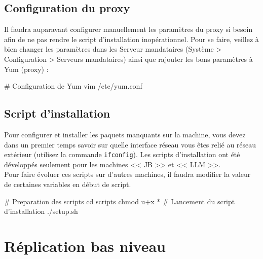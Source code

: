 \documentclass[11pt,a4paper]{report}
\begin{document}
            \subsection{Configuration du proxy}
                
                Il faudra auparavant configurer manuellement les param\`etres du proxy si besoin afin de ne pas rendre le script d'installation inop\'erationnel.
                Pour se faire, veillez \`a bien changer les param\`etres dans les Serveur mandataires (Syst\`eme > Configuration > Serveurs mandataires) ainsi que rajouter les bons param\`etres \`a Yum (proxy) :\\
                
                \begin{bashcode}
                    # Configuration de Yum
                    vim /etc/yum.conf
                \end{bashcode}
                
            \subsection{Script d'installation}
                
                Pour configurer et installer les paquets manquants sur la machine, vous devez dans un premier temps savoir sur quelle interface r\'eseau vous \^etes reli\'e au r\'eseau ext\'erieur (utilisez la commande \verb+ifconfig+). Les scripts d'installation ont \'et\'e d\'evelopp\'es seulement pour les machines << JB >> et << LLM >>.\\
                
                Pour faire \'evoluer ces scripts sur d'autres machines, il faudra modifier la valeur de certaines variables en d\'ebut de script.\\
                
                \begin{bashcode}
                    # Preparation des scripts
                    cd scripts
                    chmod u+x *
                    # Lancement du script d'installation
                    ./setup.sh
                \end{bashcode}
                
        \section{R\'eplication bas niveau}
            
\end{document}
